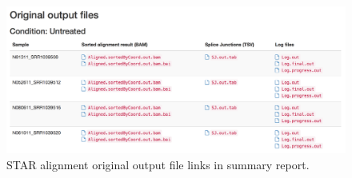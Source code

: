 \begin{figure}[!tb]
\centering
\includegraphics[width=1\textwidth]{images/report_align_links}
\caption[STAR alignment original output file links in summary report]{
    STAR alignment original output file links in summary report.
}
\label{fig:report-align-link}
\end{figure}
